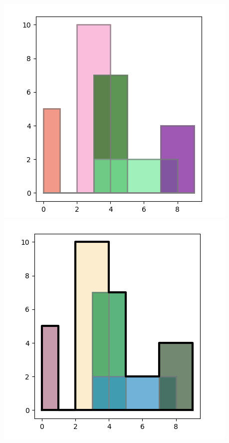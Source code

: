 \documentclass[11pt,class=report,crop=false]{standalone}
\begin{document}
\begin{activite}[Skyline]
\begin{center}
	\includegraphics[scale=\myscale,scale=0.3]{ecran-skyline-1}\qquad
	\includegraphics[scale=\myscale,scale=0.3]{ecran-skyline-2}\qquad

\end{center}
\end{activite}
\end{document}
